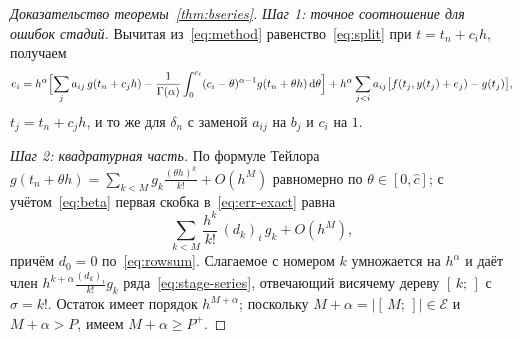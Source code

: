 \begin{proof}[Доказательство теоремы~\ref{thm:bseries}]
\emph{Шаг 1: точное соотношение для ошибок стадий.} Вычитая из~\eqref{eq:method} равенство~\eqref{eq:split} при $t=t_n+c_ih$, получаем
\begin{equation}\label{eq:err-exact}
e_i=h^{\alpha}\Bigl[\sum_ja_{ij}\,g(t_n+c_jh)-\frac{1}{\Gamma(\alpha)}\int_0^{c_i}(c_i-\theta)^{\alpha-1}g(t_n+\theta h)\,\mathrm{d}\theta\Bigr]
+h^{\alpha}\sum_{j<i}a_{ij}\bigl[f(t_j,y(t_j)+e_j)-g(t_j)\bigr],
\end{equation}
$t_j=t_n+c_jh$, и то же для $\delta_n$ с заменой $a_{ij}$ на $b_j$ и $c_i$ на $1$.

\emph{Шаг 2: квадратурная часть.} По формуле Тейлора $g(t_n+\theta h)=\sum_{k<M}g_k\frac{(\theta h)^k}{k!}+O(h^M)$ равномерно по $\theta\in[0,\hat c]$; с учётом~\eqref{eq:beta} первая скобка в~\eqref{eq:err-exact} равна
\[
\sum_{k<M}\frac{h^k}{k!}\,(d_k)_i\,g_k+O(h^{M}),
\]
причём $d_0=0$ по~\eqref{eq:rowsum}. Слагаемое с номером $k$ умножается на $h^{\alpha}$ и даёт член $h^{k+\alpha}\frac{(d_k)_i}{k!}g_k$ ряда~\eqref{eq:stage-series}, отвечающий висячему дереву $[\,k;\,]$ с $\sigma=k!$. Остаток имеет порядок $h^{M+\alpha}$; поскольку $M+\alpha=|[\,M;\,]|\in\mathcal E$ и $M+\alpha>P$, имеем $M+\alpha\ge P^{+}$.


\end{proof}
